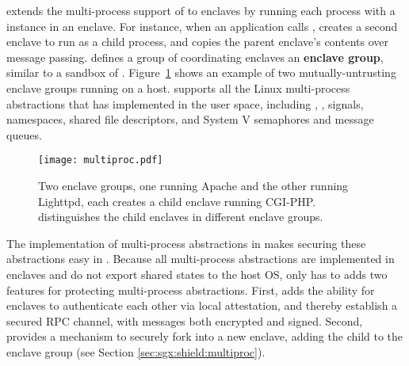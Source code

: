 \graphenesgx{} extends the multi-process support of \graphene{} to enclaves by running each
process with a \libos{} instance in an enclave.
For instance, when an application calls , \graphenesgx{} creates a second enclave to run as a child process,
and copies the parent enclave's contents over message passing.
\graphenesgx{} defines
a group of coordinating enclaves an {\bf enclave group},
similar to a sandbox of \graphene{}.
Figure~\ref{fig:sgx:enclave-groups} shows an example of two mutually-untrusting enclave groups running on a host.
\graphenesgx{} supports all the Linux multi-process abstractions that \graphene{} has implemented in the user space,
including , , signals, namespaces, shared file descriptors, and System V semaphores and message queues.


\begin{figure}[t!]
\centering
\texttt{[image: multiproc.pdf]}
\caption{Two enclave groups, one running Apache and the other running Lighttpd, each creates a child enclave running CGI-PHP.
\graphenesgx{} distinguishes the child enclaves in different enclave groups.}
\label{fig:sgx:enclave-groups}
\end{figure}



The implementation of multi-process abstractions in \graphene{}
makes securing these abstractions easy in \graphenesgx{}.
Because all multi-process abstractions are implemented in enclaves and
do not export shared states to the host OS,
\graphenesgx{} only has to adds two features for protecting multi-process abstractions.
First, \graphenesgx{} adds
the ability for enclaves to authenticate each other via local attestation,
and thereby establish a secured RPC channel,
with messages both encrypted and signed.
Second, \graphenesgx{} provides
a mechanism to securely fork into a new enclave, adding the child to the enclave group (see Section \ref{sec:sgx:shield:multiproc}).





